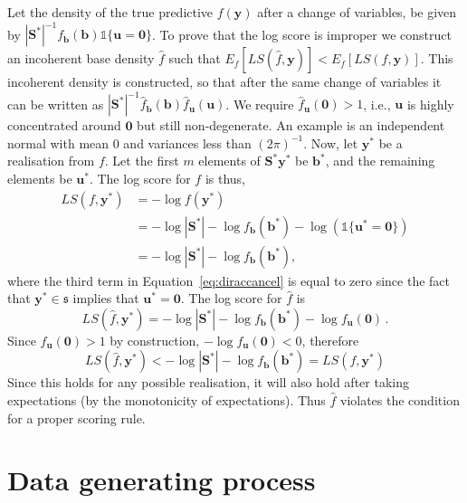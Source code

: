 \documentclass[11pt]{article}
\theoremstyle{definition}
\begin{document}
Let the density of the true predictive $f(\bm{y})$ after a change of variables, be given by $|\bm{S}^*|^{-1}f_{\bm{b}}(\bm{b})\mathbb{1}\{\bm{u}=\bm{0}\}$. To prove that the log score is improper we construct an incoherent base density $\hat{f}$ such that $E_f\left[LS\left(\hat{f},\bm{y}\right)\right]<E_f\left[LS\left(f,\bm{y}\right)\right]$. This incoherent density is constructed, so that after the same change of variables it can be written as $|\bm{S}^*|^{-1}\hat{f}_{\bm{b}}(\bm{b})\hat{f}_{\bm{u}}(\bm{u})$. We require $\hat{f}_{\bm{u}}(\bm{0})>1$, i.e., $\bm{u}$ is highly concentrated around $\bm{0}$ but still non-degenerate. An example is an independent normal with mean 0 and variances less than $(2\pi)^{-1}$. Now, let $\bm{y}^*$ be a realisation from $f$. Let the first $m$ elements of $\bm{S}^*\bm{y}^*$ be $\bm{b}^*$, and the remaining elements be $\bm{u}^*$. The log score for $f$ is thus,
\begin{align}
LS\left(f,\bm{y}^*\right) &= -\log f(\bm{y}^*) \nonumber\\
&=-\log|\bm{S}^*|-\log f_{\bm{b}}\left(\bm{b}^*\right)-\log\left(\mathbb{1}\{\bm{u}^*=\bm{0}\}\right)\label{eq:diraccancel}\\
&=-\log|\bm{S}^*|-\log f_{\bm{b}}\left(\bm{b}^*\right),\nonumber
\end{align}
where the third term in Equation~\eqref{eq:diraccancel} is equal to zero since the fact that $\bm{y}^*\in\mathfrak{s}$ implies that $\bm{u}^*=\bm{0}$. The log score for $\hat{f}$ is
\[
LS\left(\hat{f},\bm{y}^*\right) = -\log|\bm{S}^*|-\log f_{\bm{b}}(\bm{b}^*)- \log f_{\bm{u}}(\bm{0})\,.
\]
Since $f_{\bm{u}}(\bm{0})>1$ by construction, $-\log f_{\bm{u}}(\bm{0})<0$, therefore
\[
LS\left(\hat{f},\bm{y}^*\right) <-\log|\bm{S}^*|-\log f_{\bm{b}}(\bm{b}^*)=LS\left(f,\bm{y}^*\right)
\]
Since this holds for any possible realisation, it will also hold after taking expectations (by the monotonicity of expectations). Thus $\hat{f}$ violates the condition for a proper scoring rule.

\clearpage
\section{Data generating process} \label{app:DGP}
\end{document}
